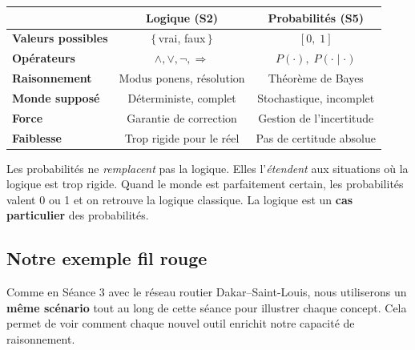 \documentclass[11pt,a4paper]{article}
\begin{document}
\begin{retenirbox}
\begin{center}
\begin{tabular}{lcc}
\toprule
& \textbf{Logique (S2)} & \textbf{Probabilités (S5)} \\
\midrule
\textbf{Valeurs possibles} & $\{$\,vrai, faux\,$\}$ & $[0, \; 1]$ \\
\textbf{Opérateurs} & $\land, \lor, \neg, \Rightarrow$ & $P(\cdot), \; P(\cdot \mid \cdot)$ \\
\textbf{Raisonnement} & Modus ponens, résolution & Théorème de Bayes \\
\textbf{Monde supposé} & Déterministe, complet & Stochastique, incomplet \\
\textbf{Force} & Garantie de correction & Gestion de l'incertitude \\
\textbf{Faiblesse} & Trop rigide pour le réel & Pas de certitude absolue \\
\bottomrule
\end{tabular}
\end{center}

Les probabilités ne \textit{remplacent} pas la logique. Elles l'\textit{étendent} aux situations où la logique est trop rigide. Quand le monde est parfaitement certain, les probabilités valent 0 ou 1 et on retrouve la logique classique. La logique est un \textbf{cas particulier} des probabilités.
\end{retenirbox}

\subsection{Notre exemple fil rouge}

Comme en Séance 3 avec le réseau routier Dakar--Saint-Louis, nous utiliserons un \textbf{même scénario} tout au long de cette séance pour illustrer chaque concept. Cela permet de voir comment chaque nouvel outil enrichit notre capacité de raisonnement.
\end{document}
